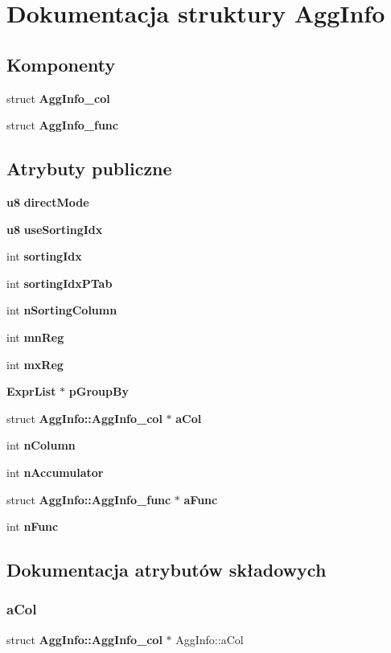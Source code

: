 \section{Dokumentacja struktury Agg\+Info}
\label{struct_agg_info}
\subsection*{Komponenty}
\begin{DoxyCompactItemize}
\item 
struct \textbf{ Agg\+Info\+\_\+col}
\item 
struct \textbf{ Agg\+Info\+\_\+func}
\end{DoxyCompactItemize}
\subsection*{Atrybuty publiczne}
\begin{DoxyCompactItemize}
\item 
\textbf{ u8} \textbf{ direct\+Mode}
\item 
\textbf{ u8} \textbf{ use\+Sorting\+Idx}
\item 
int \textbf{ sorting\+Idx}
\item 
int \textbf{ sorting\+Idx\+P\+Tab}
\item 
int \textbf{ n\+Sorting\+Column}
\item 
int \textbf{ mn\+Reg}
\item 
int \textbf{ mx\+Reg}
\item 
\textbf{ Expr\+List} $\ast$ \textbf{ p\+Group\+By}
\item 
struct \textbf{ Agg\+Info\+::\+Agg\+Info\+\_\+col} $\ast$ \textbf{ a\+Col}
\item 
int \textbf{ n\+Column}
\item 
int \textbf{ n\+Accumulator}
\item 
struct \textbf{ Agg\+Info\+::\+Agg\+Info\+\_\+func} $\ast$ \textbf{ a\+Func}
\item 
int \textbf{ n\+Func}
\end{DoxyCompactItemize}


\subsection{Dokumentacja atrybutów składowych}
\mbox{\label{struct_agg_info_a52fa1a7eb3145c27be13b2bcccd57d62}} 
\subsubsection{aCol}
{\footnotesize\ttfamily struct \textbf{ Agg\+Info\+::\+Agg\+Info\+\_\+col} $\ast$ Agg\+Info\+::a\+Col}

